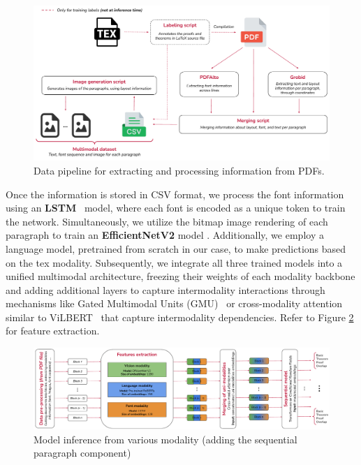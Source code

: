\documentclass[runningheads]{llncs}
\begin{document}
\begin{figure}[h]
    \centering
    \includegraphics[width=\textwidth]{images/preprocessing.pdf}
    \caption{Data pipeline for extracting and processing information from PDFs.}
    \label{fig:datapipeline}
\end{figure}

Once the information is stored in CSV format, we process the font information using an \textbf{LSTM}~\cite{hochreiter1997long} model, where 
each font is encoded as a unique token to train the network. Simultaneously, we utilize the bitmap image 
rendering of each paragraph to train an \textbf{EfficientNetV2} model \cite{efficientnet}. Additionally, we employ a language model, 
pretrained from scratch in our case, to make predictions based on the tex modality. Subsequently, we 
integrate all three trained models into a unified multimodal architecture, freezing their weights of each modality backbone and adding 
additional layers to capture intermodality interactions through mechanisms like Gated Multimodal Units 
(GMU)~\cite{arevalo2020gated} or cross-modality attention similar to ViLBERT~\cite{DBLP:conf/nips/LuBPL19} that capture intermodality dependencies. Refer to Figure \ref{fig:generalpipeline} for feature extraction.


\begin{figure}[h]
    \centering
    \includegraphics[width=\textwidth]{images/general_pipeline.pdf}
    \caption{Model inference from various modality (adding the sequential paragraph component)}
    \label{fig:generalpipeline}
\end{figure}
\end{document}
